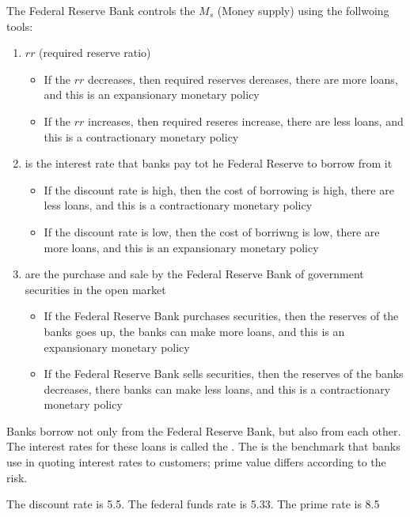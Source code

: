 \documentclass{article}
\begin{document}
The Federal Reserve Bank controls the $M_{s}$ (Money supply) using the follwoing tools: 
\begin{enumerate}
  \item $rr$ (required reserve ratio)
    \begin{itemize}
      \item If the $rr$ decreases, then required reserves dereases, there are more loans, and this is an expansionary monetary policy 
      \item If the $rr$ increases, then required reseres increase, there are less loans, and this is a contractionary monetary policy
    \end{itemize} 
  \item {} is the interest rate that banks pay tot he Federal Reserve to borrow from it 
    \begin{itemize}
      \item If the discount rate is high, then the cost of borrowing is high, there are less loans, and this is a contractionary monetary policy 
      \item If the discount rate is low, then the cost of borriwng is low, there are more loans, and this is an expansionary monetary policy
    \end{itemize}
  \item {} are the purchase and sale by the Federal Reserve Bank of government securities in the open market
    \begin{itemize}
      \item If the Federal Reserve Bank purchases securities, then the reserves of the banks goes up, the banks can make more loans, and this is an expansionary monetary policy 
      \item If the Federal Reserve Bank sells securities, then the reserves of the banks decreases, there banks can make less loans, and this is a contractionary monetary policy
    \end{itemize}
\end{enumerate}

Banks borrow not only from the Federal Reserve Bank, but also from each other. The interest rates for these loans is called the . The  is the benchmark that banks use in quoting interest rates to customers; prime value differs according to the risk. 

\begin{remark}
  The discount rate is 5.5. The federal funds rate is 5.33. The prime rate is 8.5
\end{remark}
\end{document}

